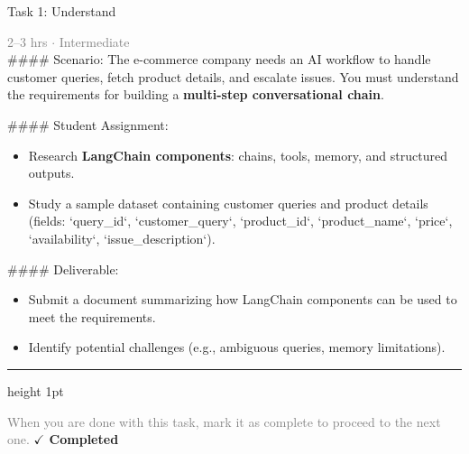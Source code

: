 \documentclass[10pt,a4paper]{article}
\begin{document}
\begin{taskbox}{Task 1: Understand}

    {\small \textcolor{gray}{2--3 hrs $\cdot$ Intermediate}}\\[12pt]

    \#\#\#\# Scenario:
The e-commerce company needs an AI workflow to handle customer queries, fetch product details, and escalate issues. You must understand the requirements for building a \textbf{multi-step conversational chain}.

\#\#\#\# Student Assignment:
\begin{itemize}
    \item Research \textbf{LangChain components}: chains, tools, memory, and structured outputs.
    \item Study a sample dataset containing customer queries and product details (fields: `query\_id`, `customer\_query`, `product\_id`, `product\_name`, `price`, `availability`, `issue\_description`).
\end{itemize}

\#\#\#\# Deliverable:
\begin{itemize}
    \item Submit a document summarizing how LangChain components can be used to meet the requirements.
    \item Identify potential challenges (e.g., ambiguous queries, memory limitations).\par
\end{itemize}

    \vspace{16pt}

    \textcolor{cardBorder}{\hrule height 1pt}\vspace{8pt}

    \small \textcolor{gray}{When you are done with this task, mark it as complete to proceed to the next one.} \hfill \textbf{\textcolor{brandDark}{$\checkmark$ Completed}}

\end{taskbox}
\end{document}
